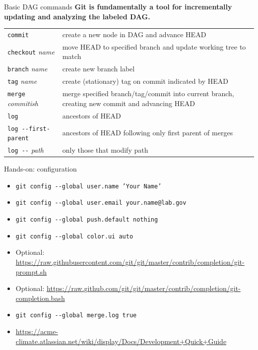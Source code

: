 \documentclass{beamer}
\begin{document}
\begin{frame}{Basic DAG commands}
  \textbf{Git is fundamentally a tool for incrementally updating and analyzing the labeled DAG.}
  \begin{tabular}{l p{2.8in}}
    \toprule
    \texttt{commit} & create a new node in DAG and advance HEAD \\
    \texttt{checkout} \textit{name} & move HEAD to specified branch and update working tree to match \\
    \texttt{branch} \textit{name} & create new branch label \\
    \texttt{tag} \textit{name} & create (stationary) tag on commit indicated by HEAD \\
    \texttt{merge} \textit{commitish} & merge specified branch/tag/commit into current branch, creating new commit and advancing HEAD \\
    \midrule
    \texttt{log} & ancestors of HEAD \\
    \texttt{log -{}-first-parent} & ancestors of HEAD following only first parent of merges \\
    \texttt{log -{}-} \textit{path} & only those that modify path \\
    \bottomrule
  \end{tabular}
\end{frame}

\begin{frame}{Hands-on: configuration}
  \begin{itemize}
  \item \texttt{git config -{}-global user.name 'Your Name'}
  \item \texttt{git config -{}-global user.email your.name@lab.gov}
  \item \texttt{git config -{}-global push.default nothing}
  \item \texttt{git config -{}-global color.ui auto}
  \item Optional: \url{https://raw.githubusercontent.com/git/git/master/contrib/completion/git-prompt.sh}
  \item Optional: \url{https://raw.github.com/git/git/master/contrib/completion/git-completion.bash}
  \item \texttt{git config -{}-global merge.log true}
  \item \url{https://acme-climate.atlassian.net/wiki/display/Docs/Development+Quick+Guide}
  \end{itemize}
\end{frame}
\end{document}

